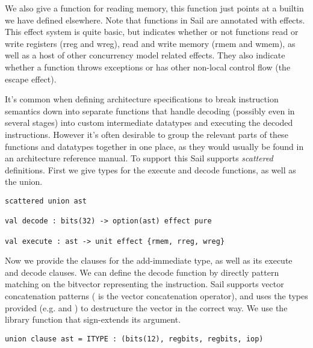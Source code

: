 
\sailoverloadXXX

We also give a function  for reading memory, this function
just points at a builtin we have defined elsewhere. Note that
functions in Sail are annotated with effects. This effect system is
quite basic, but indicates whether or not functions read or write
registers (rreg and wreg), read and write memory (rmem and wmem), as
well as a host of other concurrency model related effects. They also
indicate whether a function throws exceptions or has other non-local
control flow (the escape effect).


It's common when defining architecture specifications to break
instruction semantics down into separate functions that handle
decoding (possibly even in several stages) into custom intermediate
datatypes and executing the decoded instructions. However it's often
desirable to group the relevant parts of these functions and datatypes
together in one place, as they would usually be found in an
architecture reference manual. To support this Sail supports
\emph{scattered} definitions. First we give types for the execute and
decode functions, as well as the  union.


\begin{lstlisting}
scattered union ast

val decode : bits(32) -> option(ast) effect pure

val execute : ast -> unit effect {rmem, rreg, wreg}
\end{lstlisting}

Now we provide the clauses for the add-immediate  type, as
well as its execute and decode clauses. We can define the decode
function by directly pattern matching on the bitvector representing
the instruction. Sail supports vector concatenation patterns (
is the vector concatenation operator), and uses the types provided
(e.g.  and ) to destructure the vector in the
correct way. We use the  library function that sign-extends
its argument.

\begin{lstlisting}
union clause ast = ITYPE : (bits(12), regbits, regbits, iop)
\end{lstlisting}

\sailfclITYPEdecode
\sailfclITYPEexecute

